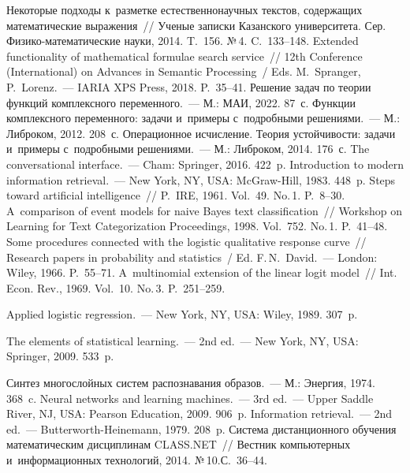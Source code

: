 \begin{multicols}{2}
{{\begin{thebibliography}{99}
 Некоторые подходы к~разметке 
естественнонаучных текс\-тов, содержащих математические выражения~// Ученые записки 
Казанского университета. Сер. Фи\-зи\-ко-ма\-те\-ма\-ти\-че\-ские науки, 2014. T.~156. №\,4. C.~133--148.
 Extended functionality of 
mathematical formulae search service~// 12th Conference (International) on Advances in 
Semantic Processing~/ Eds. M.~Spranger, P.~Lorenz.~--- IARIA XPS Press, 2018. P.~35--41.
 Решение задач по тео\-рии функций 
комплексного переменного.~--- М.: МАИ, 2022. 87~с.
 Функции комплексного 
переменного: задачи и~примеры с~по\-дроб\-ны\-ми решениями.~--- М.: Либ\-ро\-ком, 2012. 208~с.
 Операционное исчисление. Тео\-рия 
устойчивости: задачи и~примеры с~по\-дроб\-ны\-ми решениями.~--- М.: Либ\-ро\-ком, 2014. 176~с.
 The conversational interface.~--- Cham: Springer, 2016. 422~p.
 Introduction to modern information retrieval.~--- New York, NY, USA: McGraw-Hill, 1983. 448~p.
 Steps toward artificial intelligence~// P.~IRE, 1961. Vol.~49. No.\,1. P.~8--30.
 A~comparison of event models for naive Bayes text 
classification~// Workshop on Learning for Text Categorization Proceedings, 1998. Vol.~752. No.\,1. P.~41--48.
 Some procedures connected with the logistic qualitative response curve~// 
Research papers in probability and statistics~/ Ed. F.\,N.~David.~--- London: Wiley, 1966. P.~55--71.
 A~multinomial extension of the linear logit model~// Int. Econ. 
Rev., 1969. Vol.~10. No.\,3. P.~251--259.

 Applied logistic regression.~--- New York, NY, USA: Wiley, 1989. 307~p.

 The elements of statistical learning.~--- 2nd ed.~---  New York, NY, USA: Springer, 2009. 533~p.

 Син\-тез многослойных сис\-тем распознавания образов.~--- М.: Энергия, 1974. 368~c.
 Neural networks and learning machines.~--- 3rd ed.~--- Upper Saddle River, NJ, USA: Pearson Education, 2009. 906~p.
 Information retrieval.~--- 2nd ed.~--- Butterworth-Heinemann, 1979. 208~p.
 Сис\-те\-ма дистанционного 
обуче\-ния математическим дисциплинам CLASS.NET~// Вестник компьютерных 
и~информационных технологий, 2014. №\,10.\linebreak С.~36--44.


\end{thebibliography}}}
\end{multicols}
